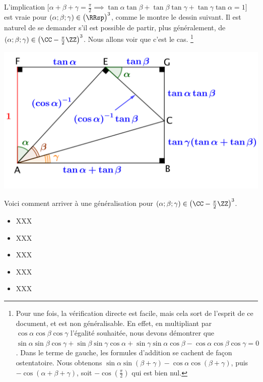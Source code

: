 

\begin{example}
    L'implication
    $\big[
        \alpha + \beta + \gamma = \frac{\pi}{2}
        \implies
          \tan \alpha \tan \beta
        + \tan \beta  \tan \gamma
        + \tan \gamma \tan \alpha
        = 1
    \big]$
    est vraie pour 
    $(\alpha ; \beta ; \gamma) \in \big( \RRsp \big)^3$,
    comme le montre le dessin suivant.
    Il est naturel de se demander s'il est possible de partir, plus généralement, de
    $(\alpha ; \beta ; \gamma) \in \big( \CC - \frac{\pi}{2} \ZZ \big)^3$.
    Nous allons voir que c'est le cas.
    \footnote{
    	Pour une fois, la vérification directe est facile, mais cela sort de l'esprit de ce document, et est non généralisable.
		En effet,
		en multipliant par $\cos \alpha \cos \beta \cos \gamma$ l'égalité souhaitée, nous devons démontrer que
		$ \sin \alpha \sin \beta  \cos \gamma
        + \sin \beta  \sin \gamma \cos \alpha
        + \sin \gamma \sin \alpha \cos \beta
        - \cos \alpha \cos \beta  \cos \gamma
        = 0$.
        Dans le terme de gauche, les formules d'addition se cachent de façon ostentatoire.
        Nous obtenons
		$ \sin \alpha \sin(\beta + \gamma)
        - \cos \alpha \cos(\beta + \gamma)$,
        puis
		$ - \cos (\alpha + \beta + \gamma)$,
        soit
		$- \cos (\frac{\pi}{2})$
		qui est bien nul.
    }
    
    \begin{center}
    	\includegraphics[scale=.75]{sum-tan-prod.png}
    \end{center}
    
    Voici comment arriver à une généralisation pour
    $(\alpha ; \beta ; \gamma) \in \big( \CC - \frac{\pi}{2} \ZZ \big)^3$.
    \begin{itemize}
    	\item XXX


    	\item XXX


    	\item XXX


    	\item XXX


    	\item XXX
    \end{itemize}
\end{example}